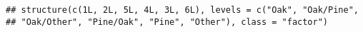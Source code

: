 \documentclass[
]{article}
\newenvironment{Shaded}{\begin{snugshade}}{\end{snugshade}}
\newcommand{\AttributeTok}[1]{\textcolor[rgb]{0.13,0.29,0.53}{#1}}
\newcommand{\FunctionTok}[1]{\textcolor[rgb]{0.13,0.29,0.53}{\textbf{#1}}}
\newcommand{\NormalTok}[1]{#1}
\newcommand{\SpecialCharTok}[1]{\textcolor[rgb]{0.81,0.36,0.00}{\textbf{#1}}}
\newcommand{\StringTok}[1]{\textcolor[rgb]{0.31,0.60,0.02}{#1}}
\begin{document}
\begin{verbatim}
## structure(c(1L, 2L, 5L, 4L, 3L, 6L), levels = c("Oak", "Oak/Pine", 
## "Oak/Other", "Pine/Oak", "Pine", "Other"), class = "factor")
\end{verbatim}

\begin{Shaded}
\end{Shaded}
\end{document}
